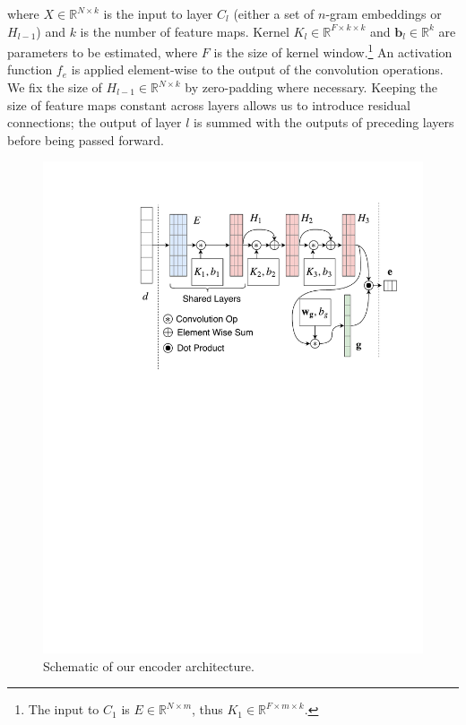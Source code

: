 \documentclass[11pt,a4paper]{article}
\begin{document}
\noindent where $X \in \mathbb{R}^{N \times k}$ is the input to layer $C_l$ (either a set of $n$-gram embeddings or $H_{l-1}$) and $k$ is the number of feature maps. Kernel $K_l \in \mathbb{R}^{F \times k \times k}$ and ${\mathbf b_l} \in \mathbb{R}^{k}$ are parameters to be estimated, where $F$ is the size of kernel window.\footnote{The input to $C_1$ is $E \in \mathbb{R}^{N \times m}$, thus $K_1 \in \mathbb{R}^{F \times m \times k}$.} An activation function $f_e$ is applied element-wise to the output of the convolution operations. We fix the size of $H_{l-1} \in \mathbb{R}^{N \times k}$ by zero-padding where necessary. Keeping the size of feature maps constant across layers allows us to introduce residual connections; the output of layer $l$ is summed with the outputs of preceding layers before being passed forward. 

 \begin{figure}
	\centering
    \includegraphics[width=\columnwidth]{figures/model.pdf}
     \vspace{-.75em}
    \caption{Schematic of our encoder architecture.}
    \label{fig:encoder}
    \vspace{-.65em}
\end{figure}
\end{document}
